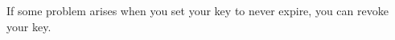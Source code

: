 \documentclass{article}
\begin{document}
% 

If some problem arises when you set your key to never expire, you can revoke your key.
\end{document}
